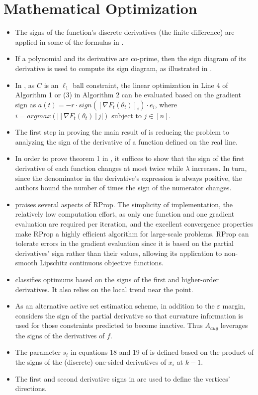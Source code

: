 \documentclass[11pt]{book}
\begin{document}
\section{Mathematical Optimization}
\begin{itemize}
\item The signs of the function's discrete derivatives (the finite difference)
are applied in some of the formulas in \cite{svanberg2007mma}.
\item If a polynomial and its derivative are co-prime, then the sign diagram
of its derivative is used to compute its sign diagram, as illustrated
in \cite{monniaux2007optimal}.
\item In \cite{lafond2015online},
as $C$ is an $\ell_{1}$ ball constraint, the linear optimization
in Line 4 of Algorithm 1 or (3) in Algorithm 2 can be evaluated based
on the gradient sign as $a\left(t\right)=-r\cdot sign\left(\left[\nabla F_{t}(\theta_{t})\right]_{i}\right)\cdot e_{i}$,
where $i=argmax\left(\left|\left[\nabla F_{t}\left(\theta_{t}\right)\right]j\right|\right)$
subject to $j\in\left[n\right]$.
\item The first step in proving the main result of \cite{chorwadwala2015eigenvalue}
is reducing the problem to analyzing the sign of the derivative of
a function defined on the real line.
\item In order to prove theorem 1 in \cite{holzhauser2017fptas},
it suffices to show that the sign of the first derivative of each
function changes at most twice while $\lambda$ increases. In turn,
since the denominator in the derivative's expression is always positive,
the authors bound the number of times the sign of the numerator changes.
\item \cite{kotsialos2019constrained}
praises several aspects of RProp. The simplicity of implementation,
the relatively low computation effort, as only one function and one
gradient evaluation are required per iteration, and the excellent
convergence properties make RProp a highly efficient algorithm for
large-scale problems. RProp can tolerate errors in the gradient evaluation
since it is based on the partial derivatives' sign rather than their
values, allowing its application to non-smooth Lipschitz continuous
objective functions.
\item \cite{prishchenko2020analysis}
classifies optimums based on the signs of the first and higher-order
derivatives. It also relies on the local trend near the point.
\item As an alternative active set estimation scheme, in addition to the
$\varepsilon$ margin, \cite{kan2021pnkh}
considers the sign of the partial derivative so that curvature information
is used for those constraints predicted to become inactive. Thus $A_{aug}$
leverages the signs of the derivatives of $f$.
\item The parameter $s_{i}$ in equations 18 and 19 of \cite{lahmdani2021smoothing}
is defined based on the product of the signs of the (discrete) one-sided
derivatives of $x_{i}$ at $k-1$.
\item The first and second derivative signs in \cite{zhao2021flexibility}
are used to define the vertices' directions.
\end{itemize}
\end{document}
